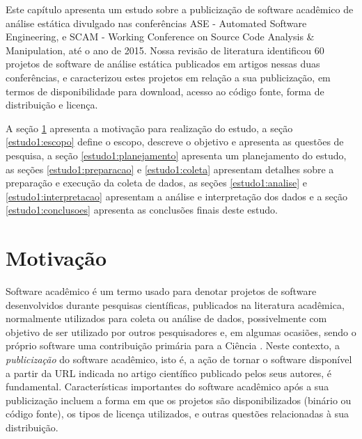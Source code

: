\label{estudo1}

\newcommand{\changelocaltocdepth}[1]{%
  \addtocontents{toc}{\protect\setcounter{tocdepth}{#1}}%
  \setcounter{tocdepth}{#1}%
}

Este capítulo apresenta um estudo sobre a publicização de software acadêmico
de análise estática divulgado nas conferências ASE - Automated Software Engineering, e 
SCAM - Working Conference on Source Code Analysis \& Manipulation, até o ano de 2015.
Nossa revisão de literatura identificou
60 projetos de software de análise estática
publicados em artigos nessas duas conferências, e caracterizou estes
projetos em relação a sua publicização, em termos de disponibilidade para
download, acesso ao código fonte, forma de distribuição e licença.

A seção \ref{estudo1:introducao} apresenta a motivação para realização do estudo,
a seção \ref{estudo1:escopo} define o escopo, descreve o objetivo e apresenta as questões de pesquisa,
a seção \ref{estudo1:planejamento} apresenta um planejamento do estudo,
as seções \ref{estudo1:preparacao} e \ref{estudo1:coleta} apresentam detalhes sobre a preparação e execução da coleta de dados,
as seções \ref{estudo1:analise} e \ref{estudo1:interpretacao} apresentam a análise e interpretação dos dados e
a seção \ref{estudo1:conclusoes} apresenta as conclusões finais deste estudo.

\section{Motivação} \label{estudo1:introducao} %

Software acadêmico é um termo usado para denotar
projetos de software desenvolvidos durante pesquisas científicas,
publicados na literatura acadêmica, normalmente utilizados para coleta ou
análise de dados, possivelmente com objetivo de ser utilizado por outros
pesquisadores e, em algumas ocasiões, sendo o próprio software uma contribuição
primária para a Ciência \cite{howison2011scientific}.
%
Neste contexto, a \textit{publicização} do software acadêmico, isto é,
a ação de tornar o software disponível 
a partir da URL indicada no artigo científico publicado pelos seus autores,
é fundamental.
Características importantes do software acadêmico após a sua publicização
incluem a forma em que os projetos são disponibilizados (binário ou código fonte),
os tipos de licença utilizados, e outras questões relacionadas à sua distribuição.

